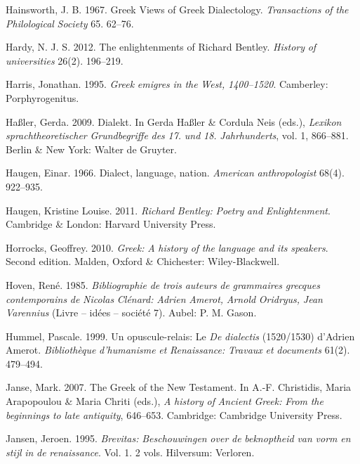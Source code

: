 \documentclass[output=paper]{langsci/langscibook}
\begin{document}
Hainsworth, J. B. 1967. Greek Views of Greek Dialectology. \textit{Transactions} \textit{of} \textit{the} \textit{Philological} \textit{Society} 65. 62–76.

Hardy, N. J. S. 2012. The enlightenments of Richard Bentley. \textit{History} \textit{of} \textit{universities} 26(2). 196–219.

Harris, Jonathan. 1995. \textit{Greek} \textit{emigres} \textit{in} \textit{the} \textit{West,} \textit{1400–1520}. Camberley: Porphyrogenitus.

Haßler, Gerda. 2009. Dialekt. In Gerda Haßler \& Cordula Neis (eds.), \textit{Lexikon} \textit{sprachtheoretischer} \textit{Grundbegriffe} \textit{des} \textit{17.} \textit{und} \textit{18.} \textit{Jahrhunderts}, vol. 1, 866–881. Berlin \& New York: Walter de Gruyter.

Haugen, Einar. 1966. Dialect, language, nation. \textit{American} \textit{anthropologist} 68(4). 922–935.

Haugen, Kristine Louise. 2011. \textit{Richard} \textit{Bentley:} \textit{Poetry} \textit{and} \textit{Enlightenment}. Cambridge \& London: Harvard University Press.

Horrocks, Geoffrey. 2010. \textit{Greek:} \textit{A} \textit{history} \textit{of} \textit{the} \textit{language} \textit{and} \textit{its} \textit{speakers}. Second edition. Malden, Oxford \& Chichester: Wiley-Blackwell.

Hoven, René. 1985. \textit{Bibliographie} \textit{de} \textit{trois} \textit{auteurs} \textit{de} \textit{grammaires} \textit{grecques} \textit{contemporains} \textit{de} \textit{Nicolas} \textit{Clénard:} \textit{Adrien} \textit{Amerot,} \textit{Arnold} \textit{Oridryus,} \textit{Jean} \textit{Varennius} (Livre – idées – société 7). Aubel: P. M. Gason.

Hummel, Pascale. 1999. Un opuscule-relais: Le \textit{De} \textit{dialectis} (1520/1530) d’Adrien Amerot. \textit{Bibliothèque} \textit{d’humanisme} \textit{et} \textit{Renaissance:} \textit{Travaux} \textit{et} \textit{documents} 61(2). 479–494.

Janse, Mark. 2007. The Greek of the New Testament. In A.-F. Christidis, Maria Arapopoulou \& Maria Chriti (eds.), \textit{A} \textit{history} \textit{of} \textit{Ancient} \textit{Greek:} \textit{From} \textit{the} \textit{beginnings} \textit{to} \textit{late} \textit{antiquity}, 646–653. Cambridge: Cambridge University Press.

Jansen, Jeroen. 1995. \textit{Brevitas:} \textit{Beschouwingen} \textit{over} \textit{de} \textit{beknoptheid} \textit{van} \textit{vorm} \textit{en} \textit{stijl} \textit{in} \textit{de} \textit{renaissance}. Vol. 1. 2 vols. Hilversum: Verloren.
\end{document}
